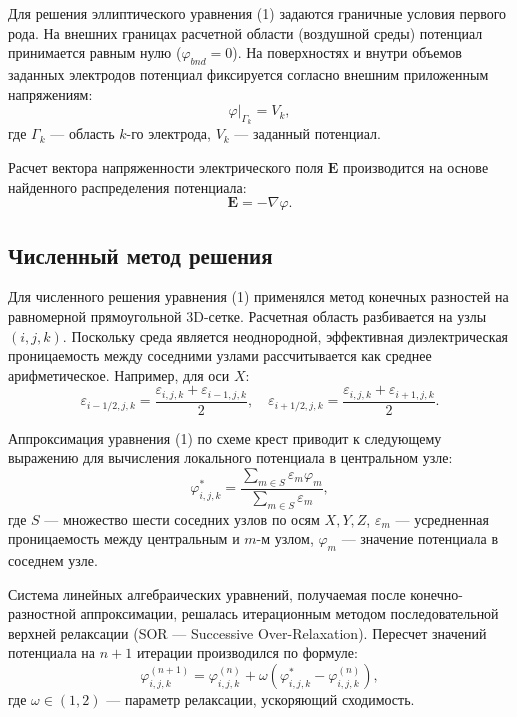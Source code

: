 \documentclass[a4paper,14pt]{extreport} %
\begin{document}
Для решения эллиптического уравнения (1) задаются граничные условия первого рода. На внешних границах расчетной области (воздушной среды) потенциал принимается равным нулю ($\varphi_{bnd} = 0$). На поверхностях и внутри объемов заданных электродов потенциал фиксируется согласно внешним приложенным напряжениям:
\begin{equation}
    \varphi\big|_{\Gamma_k} = V_k,
\end{equation}
где $\Gamma_k$ — область $k$-го электрода, $V_k$ — заданный потенциал.

Расчет вектора напряженности электрического поля $\mathbf{E}$ производится на основе найденного распределения потенциала:
\begin{equation}
    \mathbf{E} = -\nabla \varphi.
\end{equation}

\subsection{Численный метод решения}
Для численного решения уравнения (1) применялся метод конечных разностей на равномерной прямоугольной 3D-сетке. Расчетная область разбивается на узлы $(i, j, k)$. Поскольку среда является неоднородной, эффективная диэлектрическая проницаемость между соседними узлами рассчитывается как среднее арифметическое. Например, для оси $X$:
\begin{equation}
    \varepsilon_{i-1/2, j, k} = \frac{\varepsilon_{i, j, k} + \varepsilon_{i-1, j, k}}{2}, \quad 
    \varepsilon_{i+1/2, j, k} = \frac{\varepsilon_{i, j, k} + \varepsilon_{i+1, j, k}}{2}.
\end{equation}

Аппроксимация уравнения (1) по схеме крест приводит к следующему выражению для вычисления локального потенциала в центральном узле:
\begin{equation}
    \varphi_{i,j,k}^* = \frac{\sum \limits_{m \in S} \varepsilon_{m} \varphi_{m}}{\sum \limits_{m \in S} \varepsilon_{m}},
\end{equation}
где $S$ — множество шести соседних узлов по осям $X, Y, Z$, $\varepsilon_m$ — усредненная проницаемость между центральным и $m$-м узлом, $\varphi_m$ — значение потенциала в соседнем узле. 

Система линейных алгебраических уравнений, получаемая после конечно-разностной аппроксимации, решалась итерационным методом последовательной верхней релаксации (SOR --- Successive Over-Relaxation). Пересчет значений потенциала на $n+1$ итерации производился по формуле:
\begin{equation}
    \varphi_{i,j,k}^{(n+1)} = \varphi_{i,j,k}^{(n)} + \omega \left( \varphi_{i,j,k}^* - \varphi_{i,j,k}^{(n)} \right),
\end{equation}
где $\omega \in (1, 2)$ — параметр релаксации, ускоряющий сходимость.
\end{document}
